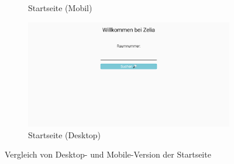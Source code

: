 \begin{figure}[H]
\begin{subfigure}[b]{0.34\textwidth}
        \caption{Startseite (Mobil)}
        \label{fig:homeMobile}
    \end{subfigure} \hfill
    \begin{subfigure}[b]{0.64\textwidth}
        \centering
        \includegraphics[width=\textwidth]{media/ResponsiveDesign/ZeliaHome.png}
        \caption{Startseite (Desktop)}
        \label{fig:homeDesktop}
    \end{subfigure} 
    \caption{Vergleich von Desktop- und Mobile-Version der Startseite}
    \label{fig:home}
\end{figure}